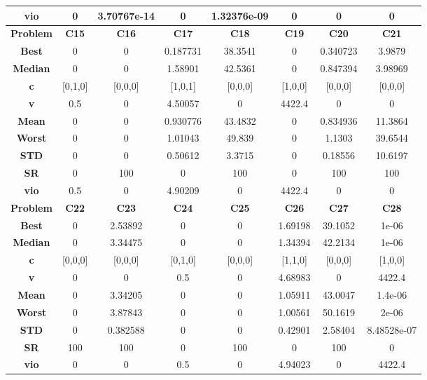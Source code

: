 \documentclass{IEEEtran}
\begin{document}
\begin{center}
\begin{tabular}{|c|c|c|c|c|c|c|c|}
    \textbf{vio} & 0 & 3.70767e-14 & 0 & 1.32376e-09 & 0 & 0 & 0\\ 
    \hline 
    \hline 
    \textbf{Problem} & \textbf{C15} & \textbf{C16} & \textbf{C17} & \textbf{C18} & \textbf{C19} & \textbf{C20} & \textbf{C21} \\ 
    \hline\hline 
    \textbf{Best} & 0 & 0 & 0.187731 & 38.3541 & 0 & 0.340723 & 3.9879\\ 
    \textbf{Median} & 0 & 0 & 1.58901 & 42.5361 & 0 & 0.847394 & 3.98969\\ 
    \textbf{c} & [0,1,0] & [0,0,0] & [1,0,1] & [0,0,0] & [1,0,0] & [0,0,0] & [0,0,0]\\ 
    \textbf{v} & 0.5 & 0 & 4.50057 & 0 & 4422.4 & 0 & 0\\ 
    \textbf{Mean} & 0 & 0 & 0.930776 & 43.4832 & 0 & 0.834936 & 11.3864\\ 
    \textbf{Worst} & 0 & 0 & 1.01043 & 49.839 & 0 & 1.1303 & 39.6544\\ 
    \textbf{STD} & 0 & 0 & 0.50612 & 3.3715 & 0 & 0.18556 & 10.6197\\ 
    \textbf{SR} & 0 & 100 & 0 & 100 & 0 & 100 & 100\\ 
    \textbf{vio} & 0.5 & 0 & 4.90209 & 0 & 4422.4 & 0 & 0\\ 
    \hline 
    \hline 
    \textbf{Problem} & \textbf{C22} & \textbf{C23} & \textbf{C24} & \textbf{C25} & \textbf{C26} & \textbf{C27} & \textbf{C28} \\ 
    \hline\hline 
    \textbf{Best} & 0 & 2.53892 & 0 & 0 & 1.69198 & 39.1052 & 1e-06\\ 
    \textbf{Median} & 0 & 3.34475 & 0 & 0 & 1.34394 & 42.2134 & 1e-06\\ 
    \textbf{c} & [0,0,0] & [0,0,0] & [0,1,0] & [0,0,0] & [1,1,0] & [0,0,0] & [1,0,0]\\ 
    \textbf{v} & 0 & 0 & 0.5 & 0 & 4.68983 & 0 & 4422.4\\ 
    \textbf{Mean} & 0 & 3.34205 & 0 & 0 & 1.05911 & 43.0047 & 1.4e-06\\ 
    \textbf{Worst} & 0 & 3.87843 & 0 & 0 & 1.00561 & 50.1619 & 2e-06\\ 
    \textbf{STD} & 0 & 0.382588 & 0 & 0 & 0.42901 & 2.58404 & 8.48528e-07\\ 
    \textbf{SR} & 100 & 100 & 0 & 100 & 0 & 100 & 0\\ 
    \textbf{vio} & 0 & 0 & 0.5 & 0 & 4.94023 & 0 & 4422.4\\ 
    \hline 
  \end{tabular}
\end{center}
\newpage
\end{document}
